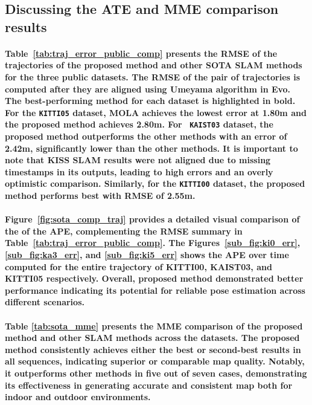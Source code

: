 \subsection{Discussing the ATE and MME comparison results}
\paragraph{\textnormal{
		Table~\ref{tab:traj_error_public_comp} presents the RMSE of the trajectories of the proposed method and other SOTA SLAM methods for the three public datasets. The RMSE of the pair of trajectories is computed after they are aligned using Umeyama algorithm in Evo. The best-performing method for each dataset is highlighted in bold. For the \texttt{KITTI05} dataset, MOLA achieves the lowest error at \textbf{1.80m} and the proposed method achieves \textbf{2.80m}. For \texttt{ KAIST03} dataset, the proposed method outperforms the other methods with an error of \textbf{2.42m}, significantly lower than the other methods. It is important to note that KISS SLAM results were not aligned due to missing timestamps in its outputs, leading to high errors and an overly optimistic comparison. Similarly, for the \texttt{KITTI00} dataset, the proposed method performs best with RMSE of \textbf{2.55m}.
}}

\paragraph{\textnormal{Figure~\ref{fig:sota_comp_traj} provides a detailed visual comparison of the of the APE, complementing the RMSE summary in Table~\ref{tab:traj_error_public_comp}. The Figures~\ref{sub_fig:ki0_err}, \ref{sub_fig:ka3_err}, and \ref{sub_fig:ki5_err} shows the APE over time computed for the entire trajectory of KITTI00, KAIST03, and KITTI05 respectively. Overall, proposed method demonstrated better performance indicating its potential for reliable  pose estimation across different scenarios.
}}

\paragraph{\textnormal{
Table \ref{tab:sota_mme} presents the  MME comparison of the proposed method and other SLAM methods across the datasets. The proposed method consistently achieves either the best or second-best results in all sequences, indicating superior or comparable map quality. Notably, it outperforms other methods in five out of seven cases, demonstrating its effectiveness in generating accurate and consistent map both for indoor and outdoor environments.
}}

